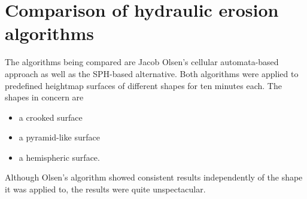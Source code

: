 \documentclass[11pt,a4paper,twoside,openright]{report}
\begin{document}
\section{Comparison of hydraulic erosion algorithms}
The algorithms being compared are Jacob Olsen's cellular automata-based approach as well as the SPH-based alternative. Both algorithms were applied to predefined heightmap surfaces of different shapes for ten minutes each. The shapes in concern are
\begin{itemize}
\item a crooked surface
\item a pyramid-like surface
\item a hemispheric surface.
\end{itemize}
Although Olsen's algorithm showed consistent results independently of the shape it was applied to, the results were quite unspectacular.
\end{document}
